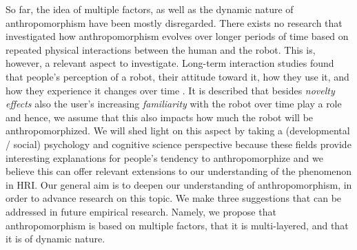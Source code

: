 \documentclass{frontiersSCNS} %
\begin{document}
So far, the idea of multiple factors, as well as the dynamic nature of anthropomorphism have been mostly disregarded. There exists no research that investigated how anthropomorphism evolves over longer periods of time based on repeated physical interactions between the human and the robot. This is, however, a relevant aspect to investigate. Long-term interaction studies found that people's perception of a robot, their attitude toward it, how they use it, and how they experience it changes over time \citep{kanda_interactive_2004,karapanos_user_2009,sung_domestic_2010}. It is described that besides \textit{novelty effects} also the user's increasing \textit{familiarity} with the robot over time play a role and hence, we assume that this also impacts how much the robot will be anthropomorphized. We will shed light on this aspect by taking a (developmental / social) psychology and cognitive science perspective because these fields provide interesting explanations for people's tendency to anthropomorphize and we believe this can offer relevant extensions to our understanding of the phenomenon in HRI. Our general aim is to deepen our understanding of anthropomorphism, in order to advance research on this topic. We make three suggestions that can be addressed in future empirical research. Namely, we propose that anthropomorphism is based on multiple factors, that it is multi-layered, and that it is of dynamic nature.




%
\end{document}
